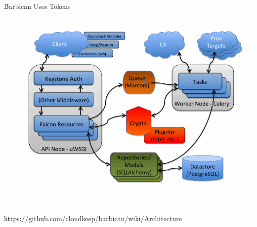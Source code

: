 \documentclass{beamer}
\begin{document}
\begin{frame}{Barbican Uses Tokens}
  \begin{block}{}
    \includegraphics[scale=0.3]{barbican-arch.png}
  \end{block}
  https://github.com/cloudkeep/barbican/wiki/Architecture
\end {frame}
\end{document}
